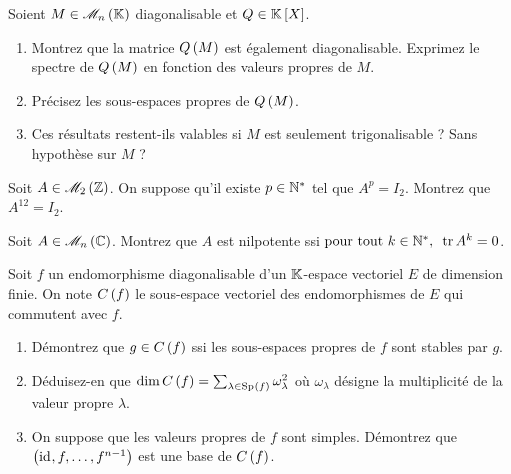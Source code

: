 \begin{corr}
\end{corr}

\begin{exoss}
Soient \(M\in\M{n}\) diagonalisable et \(Q\in\poly\).

\begin{enumerate}
    \item Montrez que la matrice \(Q\left(M\right)\) est également diagonalisable. Exprimez le spectre de \(Q\left(M\right)\) en fonction des valeurs propres de \(M\). \\
    \item Précisez les sous-espaces propres de \(Q\left(M\right)\). \\
    \item Ces résultats restent-ils valables si \(M\) est seulement trigonalisable ? Sans hypothèse sur \(M\) ?
\end{enumerate}
\end{exoss}

\begin{corr}
\end{corr}

\begin{exosss}[Exercice 25]
Soit \(A\in\M{2}[\Z]\). On suppose qu'il existe \(p\in\mathbb{N}^*\) tel que \(A^p=I_2\). Montrez que \(A^{12}=I_2\).
\end{exosss}

\begin{corr}
\end{corr}

\begin{exoss}[Exercice 26]
Soit \(A\in\M{n}[\C]\). Montrez que \(A\) est nilpotente ssi \(\quantifs{\tpt k\in\Ns}\tr A^k=0\).
\end{exoss}

\begin{corr}
\end{corr}

\begin{exoss}[Exercice 27]
Soit \(f\) un endomorphisme diagonalisable d'un \(\mathbb{K}\)-espace vectoriel \(E\) de dimension finie. On note \(C\left(f\right)\) le sous-espace vectoriel des endomorphismes de \(E\) qui commutent avec \(f\).

\begin{enumerate}
    \item Démontrez que \(g\in C\left(f\right)\) ssi les sous-espaces propres de \(f\) sont stables par \(g\). \\
    \item Déduisez-en que \(\dim C\paren{f}=\sum_{\lambda\in\Sp{f}}\omega_\lambda^2\) où \(\omega_\lambda\) désigne la multiplicité de la valeur propre \(\lambda\). \\
    \item On suppose que les valeurs propres de \(f\) sont simples. Démontrez que \(\left(\mathrm{id}_{},f,\dots,f^{n-1}\right)\) est une base de \(C\left(f\right)\).
\end{enumerate}
\end{exoss}

